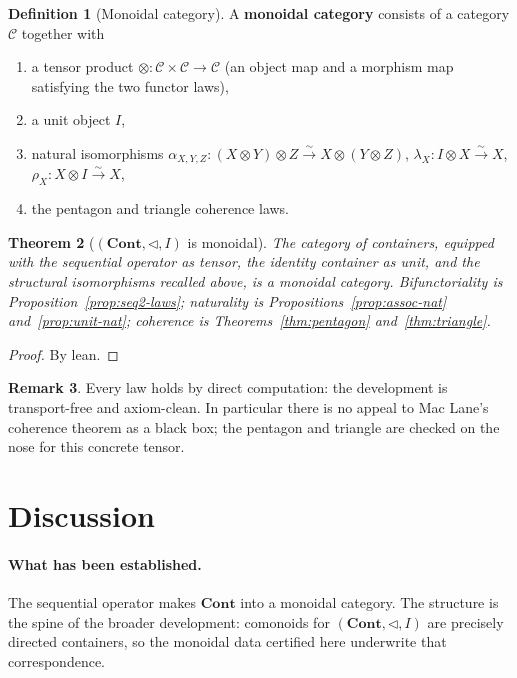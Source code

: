 \documentclass[11pt,a4paper]{article}
\theoremstyle{plain}
\newtheorem{theorem}{Theorem}[section]
\theoremstyle{definition}
\newtheorem{definition}[theorem]{Definition}
\newtheorem{remark}[theorem]{Remark}
\newcommand{\Cont}{\mathbf{Cont}}
\newcommand{\seq}{\mathbin{\triangleleft}}
\begin{document}
\begin{definition}[Monoidal category]\label{def:monoidal}
A \textbf{monoidal category} consists of a category $\mathcal{C}$
together with
\begin{enumerate}
  \item a tensor product $\otimes : \mathcal{C} \times \mathcal{C} \to
        \mathcal{C}$ (an object map and a morphism map satisfying the
        two functor laws),
  \item a unit object $I$,
  \item natural isomorphisms
        $\alpha_{X,Y,Z} : (X \otimes Y) \otimes Z
        \xrightarrow{\sim} X \otimes (Y \otimes Z)$,
        $\lambda_X : I \otimes X \xrightarrow{\sim} X$,
        $\rho_X : X \otimes I \xrightarrow{\sim} X$,
  \item the pentagon and triangle coherence laws.
\end{enumerate}
\end{definition}

\begin{theorem}[$(\Cont, \seq, I)$ is monoidal]\label{thm:cont-monoidal}
The category of containers, equipped with the sequential operator as
tensor, the identity container as unit, and the structural isomorphisms
recalled above, is a monoidal category. Bifunctoriality is
Proposition~\ref{prop:seq2-laws}; naturality is
Propositions~\ref{prop:assoc-nat} and~\ref{prop:unit-nat}; coherence is
Theorems~\ref{thm:pentagon} and~\ref{thm:triangle}.
\end{theorem}

\begin{proof}
By lean.
\end{proof}

\begin{remark}
Every law holds by direct computation: the development is transport-free
and axiom-clean. In particular there is no appeal to Mac Lane's coherence
theorem as a black box; the pentagon and triangle are checked on the
nose for this concrete tensor.
\end{remark}

\section{Discussion}

\paragraph{What has been established.}
The sequential operator makes $\Cont$ into a monoidal category. The
structure is the spine of the broader development: comonoids for
$(\Cont, \seq, I)$ are precisely directed containers, so the monoidal
data certified here underwrite that correspondence.
\end{document}

